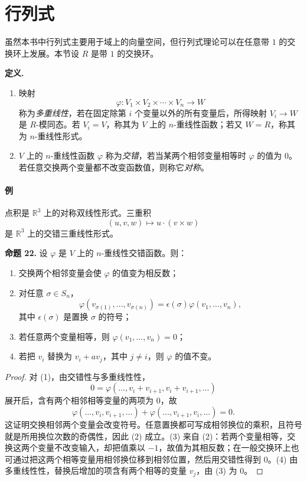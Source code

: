 \section{行列式}

虽然本书中行列式主要用于域上的向量空间，但行列式理论可以在任意带 $1$ 的交换环上发展。本节设 $R$ 是带 $1$ 的交换环。

\noindent\textbf{定义.}
\begin{enumerate}[label=(\arabic*)]
\item 映射
\[
\varphi:V_1\times V_2\times\cdots\times V_n\to W
\]
称为\emph{多重线性}，若在固定除第 $i$ 个变量以外的所有变量后，所得映射 $V_i\to W$ 是 $R$-模同态。若 $V_i=V$，称其为 $V$ 上的 $n$-重线性函数；若又 $W=R$，称其为 $n$-重线性形式。
\item $V$ 上的 $n$-重线性函数 $\varphi$ 称为\emph{交错}，若当某两个相邻变量相等时 $\varphi$ 的值为 $0$。若任意交换两个变量都不改变函数值，则称它\emph{对称}。
\end{enumerate}

\paragraph{例}
点积是 $\mathbb R^3$ 上的对称双线性形式。三重积
\[
(u,v,w)\longmapsto u\cdot(v\times w)
\]
是 $\mathbb R^3$ 上的交错三重线性形式。

\noindent\textbf{命题 22.} 设 $\varphi$ 是 $V$ 上的 $n$-重线性交错函数。则：
\begin{enumerate}[label=(\arabic*)]
\item 交换两个相邻变量会使 $\varphi$ 的值变为相反数；
\item 对任意 $\sigma\in S_n$，
\[
\varphi(v_{\sigma(1)},\ldots,v_{\sigma(n)})
=\epsilon(\sigma)\varphi(v_1,\ldots,v_n),
\]
其中 $\epsilon(\sigma)$ 是置换 $\sigma$ 的符号；
\item 若任意两个变量相等，则 $\varphi(v_1,\ldots,v_n)=0$；
\item 若把 $v_i$ 替换为 $v_i+av_j$，其中 $j\neq i$，则 $\varphi$ 的值不变。
\end{enumerate}

\begin{proof}
对 (1)，由交错性与多重线性性，
\[
0=\varphi(\ldots,v_i+v_{i+1},v_i+v_{i+1},\ldots)
\]
展开后，含有两个相邻相等变量的两项为 $0$，故
\[
\varphi(\ldots,v_i,v_{i+1},\ldots)+
\varphi(\ldots,v_{i+1},v_i,\ldots)=0.
\]
这证明交换相邻两个变量会改变符号。任意置换都可写成相邻换位的乘积，且符号就是所用换位次数的奇偶性，因此 (2) 成立。(3) 来自 (2)：若两个变量相等，交换这两个变量不改变输入，却把值乘以 $-1$，故值为其相反数；在一般交换环上也可通过把这两个相等变量用相邻换位移到相邻位置，然后用交错性得到 $0$。(4) 由多重线性性，替换后增加的项含有两个相等的变量 $v_j$，由 (3) 为 $0$。
\end{proof}

